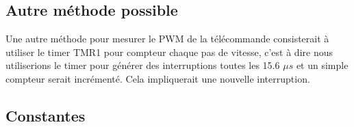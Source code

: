 \documentclass[fleqn, 11pt, a4paper]{article}
\begin{document}
    
    \subsection{Autre méthode possible}
    Une autre méthode pour mesurer le PWM de la télécommande consisterait à utiliser le timer TMR1 pour compteur chaque pas de vitesse, c'est à dire nous utiliserions le timer pour générer des interruptions toutes les 15.6 $\mu s$ et un simple compteur serait incrémenté. Cela impliquerait une nouvelle interruption.
    
  
  
	\newpage
	\begin{appendix}
	\section{Constantes}

	
	\end{appendix}
	
	
\end{document}
